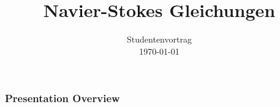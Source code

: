 \documentclass[
	11pt, %
	aspectratio=169, %
]{beamer}
\title[NSG]{Navier-Stokes Gleichungen} %
\author[Jannik Schrempp\and Hendrik Klemm]{}%
\institute[]{University of Stuttgart IAG} %
\date[\myformat\today]{Studentenvortrag \\ \myformat\today} %
\begin{document}
\newcommand\barbelow[1]{\stackunder[1.2pt]{$#1$}{\rule{.8ex}{.075ex}}}

\begin{frame}
		
	\titlepage %

\end{frame}



\begin{frame}
	\frametitle{Presentation Overview} %
	
	\tableofcontents %
\end{frame}

\end{document}
